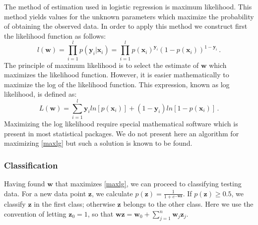 \documentclass[a4paper,11pt,oneside]{article}
\begin{document}
The method of estimation used in logistic regression is maximum likelihood. This method yields values for the unknown 
parameters which maximize the probability of obtaining the observed data. In order to apply this method we construct 
first the likelihood function as follows:
\begin{equation}
  l(\mathbf{w}) = \prod_{i=1}^l p(\mathbf{y}_i|\mathbf{x}_i) =  \prod_{i=1}^l p(\mathbf{x}_i)^{\mathbf{y}_i}(1-p(\mathbf{x}_i))^{1-\mathbf{y}_i}\,.
\end{equation}
The principle of maximum likelihood is to select the estimate of $\mathbf{w}$ which maximizes the likelihood function.
However, it is easier mathematically to maximize the log of the likelihood function. This expression, known as log likelihood,
is defined as:
\begin{equation}\label{maxlg}
  L(\mathbf{w}) = \sum_{i=1}^l {\mathbf{y}_iln[p(\mathbf{x}_i)]+(1-\mathbf{y}_i)ln[1-p(\mathbf{x}_i)]}\,.
\end{equation}
Maximizing the log likelihood require special mathematical software which is present in most statistical packages.
We do not present here an algorithm for maximizing \ref{maxlg} but such a solution is known to be found.
\subsubsection*{Classification}
Having found $\mathbf{w}$ that maximizes \ref{maxlg}, we can proceed to classifying testing data.
For a new data point $\mathbf{z}$, we calculate $p(\mathbf{z}) = \frac{1}{1+e^{-\mathbf{w}\mathbf{z}}}$.
If $p(\mathbf{z})\geq 0.5$, we classify $\mathbf{z}$ in the first class; otherwise $\mathbf{z}$ belongs to
the other class. Here we use the convention of letting $\mathbf{z}_0=1$, so that 
$\mathbf{wz} = \mathbf{w}_0 + \sum_{j=1}^n \mathbf{w}_j\mathbf{z}_j$.
\end{document}
